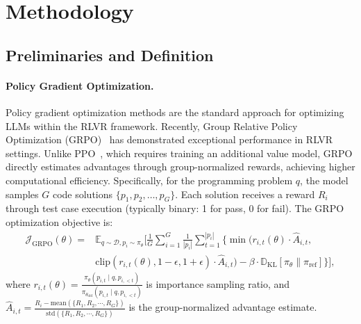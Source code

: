 \documentclass{article}
\theoremstyle{definition}
\theoremstyle{remark}
\begin{document}
\section{Methodology}

\subsection{Preliminaries and Definition}

\paragraph{Policy Gradient Optimization.} 

Policy gradient optimization methods are the standard approach for optimizing LLMs within the RLVR framework. Recently, Group Relative Policy Optimization (GRPO)~\citep{DeepSeekMath} has demonstrated exceptional performance in RLVR settings.
Unlike PPO~\citep{PPO}, which requires training an additional value model, GRPO directly estimates advantages through group-normalized rewards, achieving higher computational efficiency.
Specifically, for the programming problem $q$, the model samples $G$ code solutions $\{p_1, p_2, \ldots, p_G\}$. Each solution receives a reward $R_i$ through test case execution (typically binary: 1 for pass, 0 for fail). The GRPO optimization objective is:
\begin{equation}
\begin{aligned}
\mathcal{J}_{\text{GRPO}}(\theta) =&  \mathbb{E}_{q \sim \mathcal{D}, p_i \sim \pi_{\theta}} \Bigg[ \frac{1}{G} \sum_{i=1}^{G} \frac{1}{|p_i|} \sum_{t=1}^{|p_i|} \bigg\{ \min \Big( r_{i,t}(\theta) \cdot \hat{A}_{i,t},\\ 
& \text{clip}(r_{i,t}(\theta), 1-\epsilon, 1+\epsilon) \cdot \hat{A}_{i,t} \Big) - \beta \cdot \mathbb{D}_{\text{KL}}[\pi_\theta \| \pi_{\text{ref}}] \bigg\} \Bigg],
\end{aligned}
\end{equation}
where $r_{i,t}(\theta) = \frac{\pi_\theta(p_{i,t} \mid q, p_{i,<t})}{\pi_{\theta_{\text{old}}}(p_{i,t} \mid q, p_{i,<t})}$ is importance sampling ratio, and $\hat{A}_{i,t} = \frac{R_i - \text{mean}(\{R_1, R_2, \cdots, R_G\})}{\text{std}(\{R_1, R_2, \cdots, R_G\})}$ is the group-normalized advantage estimate.
 
\end{document}
